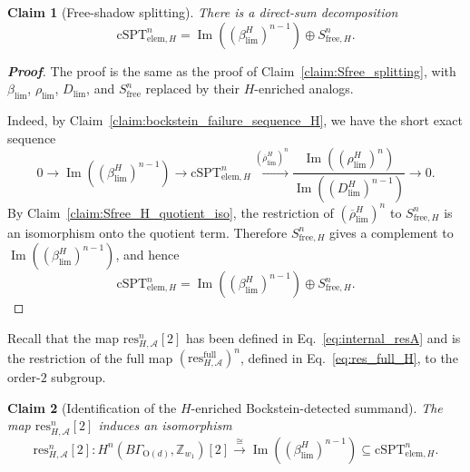 \documentclass[aps,prx,reprint,superscriptaddress,twocolumn,amsmath,amssymb,amsfonts, nofootinbib]{revtex4-2}
\newcommand{\res}{\text{res}}
\theoremstyle{apsstyle}
\newtheorem{claim}{Claim}
\begin{document}
\begin{claim}[Free-shadow splitting]
\label{claim:Sfree_H_splitting}
There is a direct-sum decomposition
\begin{equation}
\mathrm{cSPT}_{\mathrm{elem},H}^{n} = \operatorname{Im}\left(\left(\beta_{\lim}^{H}\right)^{n-1}\right)
\oplus S_{\mathrm{free},H}^{n}.
\end{equation}
\end{claim}

\begin{proof}[\textnormal{\textbf{Proof}}]
The proof is the same as the proof of Claim~\ref{claim:Sfree_splitting}, with $\beta_{\lim}$, $\rho_{\lim}$, $D_{\lim}$, and $S_{\mathrm{free}}^{n}$ replaced by their $H$-enriched analogs.

\noindent Indeed, by Claim~\ref{claim:bockstein_failure_sequence_H}, we have the short exact sequence
\begin{equation}
0
\rightarrow
\operatorname{Im}\left(\left(\beta_{\lim}^{H}\right)^{n-1}\right)
\rightarrow
\mathrm{cSPT}_{\mathrm{elem},H}^{n}
\xrightarrow{\left(\overline{\rho}_{\lim}^{H}\right)^{n}}
\frac{
\operatorname{Im}\left(\left(\rho_{\lim}^{H}\right)^{n}\right)
}{ \operatorname{Im}\left(\left(D_{\lim}^{H}\right)^{n-1}\right) } \rightarrow 0.
\end{equation}
By Claim~\ref{claim:Sfree_H_quotient_iso}, the restriction of $\left(\overline{\rho}_{\lim}^{H}\right)^{n}$ to $S_{\mathrm{free},H}^{n}$ is an isomorphism onto the quotient term. Therefore $S_{\mathrm{free},H}^{n}$ gives a complement to $\operatorname{Im}\left(\left(\beta_{\lim}^{H}\right)^{n-1}\right)$, and hence
\begin{equation}
\mathrm{cSPT}_{\mathrm{elem},H}^{n} =
\operatorname{Im}\left(\left(\beta_{\lim}^{H}\right)^{n-1}\right)
\oplus S_{\mathrm{free},H}^{n}.
\end{equation}
\end{proof}

\bigskip 

\noindent Recall that the map $\res_{H,\mathcal A}^{n}[2]$ has been defined in Eq.~\ref{eq:internal_resA} and is the restriction of the full map $\left(\res_{H,\mathcal A}^{\mathrm{full}}\right)^{n}$, defined in Eq.~\ref{eq:res_full_H}, to the order-$2$ subgroup.

\begin{claim}[Identification of the $H$-enriched Bockstein-detected summand]
\label{claim:bockstein_summand_H}
The map $\res_{H,\mathcal A}^{n}[2]$ induces an isomorphism
\begin{equation}
\res_{H,\mathcal A}^{n}[2]: H^n(B\Gamma_{\mathrm{O}(d)},\mathbb Z_{w_1})[2]
\xrightarrow{\cong} \operatorname{Im}\left(\left(\beta_{\lim}^{H}\right)^{n-1}\right)
\subseteq \mathrm{cSPT}_{\mathrm{elem},H}^{n}.
\end{equation}
\end{claim}
\end{document}
